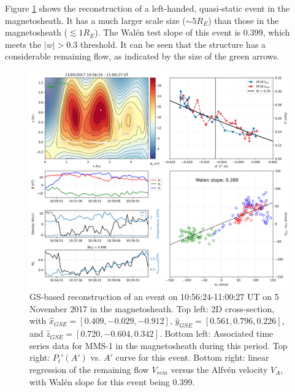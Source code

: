 Figure \ref{fig:reconstruction-Nov2017-quasistatic} shows the reconstruction of a left-handed, quasi-static event in the magnetosheath. It has a much larger scale size ($\sim 5 R_E$) than those in the magnetosheath ($\lesssim 1 R_E$). The Wal\'en test slope of this event is 0.399, which meets the $|w| > 0.3$ threshold. It can be seen that the structure has a considerable remaining flow, as indicated by the size of the green arrows.
\begin{figure}
    \centering
    \includegraphics[width=\textwidth]{Figures/Reconstructions/timeseries_walenTest_20171105_20171106.png}
    \caption[GS-based event reconstruction for 15 November 2017]{GS-based reconstruction of an event on 10:56:24-11:00:27 UT on 5 November 2017 in the magnetosheath. Top left: 2D cross-section, with $\hat{x}_{GSE}=[0.409, -0.029, -0.912]$, $\hat{y}_{GSE}=[0.561, 0.796, 0.226]$, and $\hat{z}_{GSE}=[0.720, -0.604, 0.342]$. Bottom left: Associated time series data for MMS-1 in the magnetosheath during this period. Top right: $P_t'(A')$ vs. $A'$ curve for this event. Bottom right: linear regression of the remaining flow $V_{rem}$ versus the Alfv\'en velocity $V_A$, with Wal\'en slope for this event being 0.399.} %
    \label{fig:reconstruction-Nov2017-quasistatic}
\end{figure}

